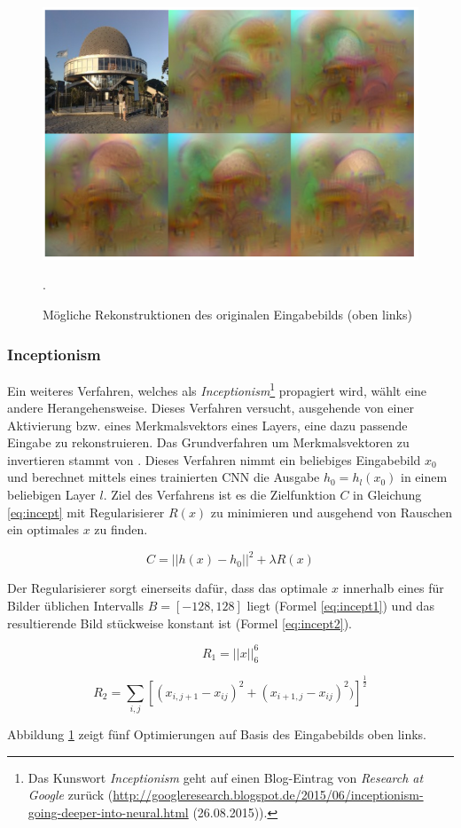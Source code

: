 \begin{figure}[t]
\centering
\includegraphics[width=0.6\linewidth]{images/4_inceptionism}
\caption[]{Mögliche Rekonstruktionen des originalen Eingabebilds (oben links) \cite[siehe][]{Simard2003}}.
\label{fig:4_inceptionism}
\end{figure}

\subsubsection{Inceptionism}
Ein weiteres Verfahren, welches als \textit{Inceptionism}\footnote{Das Kunswort \textit{Inceptionism} geht auf einen Blog-Eintrag von \textit{Research at Google} zurück (\url{http://googleresearch.blogspot.de/2015/06/inceptionism-going-deeper-into-neural.html} (26.08.2015)).} propagiert wird, wählt eine andere Herangehensweise. Dieses Verfahren versucht, ausgehende von einer Aktivierung bzw. eines Merkmalsvektors eines Layers, eine dazu passende Eingabe zu rekonstruieren. 
Das Grundverfahren um Merkmalsvektoren zu invertieren stammt von \cite{Mahendran2014}. Dieses Verfahren nimmt ein beliebiges Eingabebild $x_0$ und berechnet mittels eines trainierten CNN die Ausgabe $h_0 = h_l(x_0)$ in einem beliebigen Layer $l$. Ziel des Verfahrens ist es die Zielfunktion $C$ in Gleichung \ref{eq:incept} mit Regularisierer $R(x)$ zu minimieren und ausgehend von Rauschen ein optimales $x$ zu finden. 

\begin{equation}
\label{eq:incept}
C = ||h(x) - h_0||^2 + \lambda R(x)
\end{equation}

Der Regularisierer sorgt einerseits dafür, dass das optimale $x$ innerhalb eines für Bilder üblichen Intervalls $B = [-128,128]$ liegt (Formel \ref{eq:incept1}) und das resultierende Bild stückweise konstant ist (Formel \ref{eq:incept2}).

\begin{equation}
\label{eq:incept1}
R_1 = ||x||^6_6
\end{equation}

\begin{equation}
\label{eq:incept2}
R_2 = \sum_{i,j}^{} [(x_{i,j+1} - x_{ij})^2 + (x_{i+1,j} - x_{ij})^2)]^{\frac{1}{2}}
\end{equation}


Abbildung \ref{fig:4_inceptionism} zeigt fünf Optimierungen auf Basis des Eingabebilds oben links.


